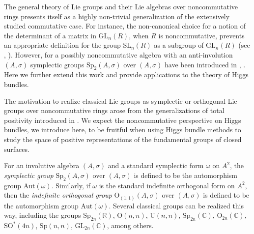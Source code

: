 \documentclass[oneside,11pt]{amsart}
\makeatletter
\theoremstyle{definition}
\theoremstyle{remark}
\let\origsection\section
\renewcommand\section{\@ifstar{\starsection}{\nostarsection}}
\newcommand\nostarsection[1]
{\sectionprelude\origsection{#1}\sectionpostlude}
\newcommand\starsection[1]
{\sectionprelude\origsection*{#1}\sectionpostlude}
\newcommand\sectionprelude{%
  \vspace{1em}
}
\newcommand\sectionpostlude{%
  \vspace{1em}
}
\numberwithin{thm}{section}
\numberwithin{equation}{section}
\makeatother
\begin{document}
\section{Introduction}


The general theory of Lie groups and their Lie algebras over noncommutative rings presents itself as a highly non-trivial generalization of the extensively studied commutative case. For instance, the non-canonical choice for a notion of the determinant of a matrix in $\mathrm{GL}_n(R)$, when $R$ is noncommutative, prevents an appropriate definition for the group $\mathrm{SL}_n(R)$ as a subgroup of $\mathrm{GL}_n(R)$ (see \cite{BR1}, \cite{BR2}). However, for a possibly noncommutative algebra with an anti-involution $(A, \sigma)$ symplectic groups $\mathrm{Sp}_2(A,\sigma)$ over $(A, \sigma)$ have been introduced in \cite{ABRRW}, \cite{Rog}. Here we further extend this work and provide applications to the theory of Higgs bundles. 

The motivation to realize classical Lie groups as symplectic or orthogonal Lie groups over noncommutative rings arose from the generalizations of total positivity introduced in \cite{GuiWie}. We expect the noncommutative perspective on Higgs bundles, we introduce here, to be fruitful when using Higgs bundle methods to study the space of positive representations of the fundamental groups of closed surfaces. 



For an involutive algebra $(A,\sigma)$ and a standard symplectic form $\omega$ on $A^2$, the \emph{symplectic group} $\mathrm{Sp}_2(A,\sigma)$ over $(A, \sigma)$ is defined to be the automorphism group $\mathrm{Aut}(\omega)$. Similarly, if $\omega$ is the standard indefinite orthogonal form on $A^2$, then the \emph{indefinite orthogonal group} $\mathrm{O}_{(1,1)}(A,\sigma)$ over $(A, \sigma)$ is defined to be the automorphism group $\mathrm{Aut}(\omega)$. Several classical groups can be realized this way, including  the groups $\mathrm{Sp}_{2n}(\mathbb{R})$, $\mathrm{O}(n,n)$, $\mathrm{U}(n,n)$, $\mathrm{Sp}_{2n}(\mathbb{C})$, $\mathrm{O}_{2n}(\mathbb{C})$, $\mathrm{SO}^*(4n)$, $\mathrm{Sp}(n,n)$, $\mathrm{GL}_{2n}(\mathbb{C})$, among others.
\end{document}
